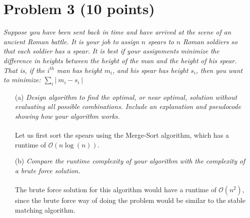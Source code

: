 \documentclass[12pt]{article}
\begin{document}
{\section*{{\selectfont Problem 3 (10 points)}}\vspace{-10mm}
\textsl{Suppose you have been sent back in time and have arrived at the scene of an ancient Roman battle. It is your job to assign $n$ spears to $n$ Roman soldiers so that each soldier has a spear. It is best if your assignments minimize the difference in heights between the height of the man and the height of his spear. That is, if the $i^{th}$ man has height $m_i$, and his spear has height $s_i$, then you want to minimize: $\sum_{i} \left| ~ m_i - s_i ~ \right|$}
\begin{enumerate}
\item[(a)]\textsl{Design algorithm to find the optimal, or near optimal, solution without evaluating all possible combinations. Include an explanation and pseudocode showing how your algorithm works.}\\ \\
Let us first sort the spears using the Merge-Sort algorithm, which has a runtime of $\mathcal{O}(n\log(n))$.
\item[(b)]\textsl{Compare the runtime complexity of your algorithm with the complexity of a brute force solution.}\\ \\
The brute force solution for this algorithm would have a runtime of $\mathcal{O}(n^2)$, since the brute force way of doing the problem would be similar to the stable matching algorithm.
\end{enumerate}

}
\end{document}
